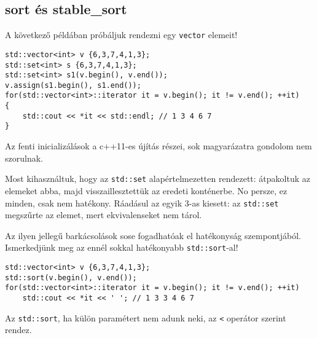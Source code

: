 \documentclass[a4paper,11.5pt,table]{article}
\begin{document}
	\subsection{sort és stable\_sort}
	A következő példában próbáljuk rendezni egy \texttt{vector} elemeit!
	\begin{lstlisting}
std::vector<int> v {6,3,7,4,1,3};
std::set<int> s {6,3,7,4,1,3};
std::set<int> s1(v.begin(), v.end());
v.assign(s1.begin(), s1.end());
for(std::vector<int>::iterator it = v.begin(); it != v.end(); ++it)
{
	std::cout << *it << std::endl; // 1 3 4 6 7 
}
	\end{lstlisting}
%	
	\begin{note}
		Az fenti inicializálások a c++11-es újítás részei, sok magyarázatra gondolom nem szorulnak.
%		
	\end{note}
	Most kihasználtuk, hogy az \texttt{std::set} alapértelmezetten rendezett: átpakoltuk az elemeket abba, majd visszaillesztettük az eredeti konténerbe. No persze, ez minden, csak nem hatékony. Ráadásul az egyik 3-as kiesett: az \texttt{std::set} megszűrte az elemet, mert ekvivalenseket nem tárol.
	
	\medskip
	Az ilyen jellegű barkácsolások sose fogadhatóak el hatékonyság szempontjából. Ismerkedjünk meg az ennél sokkal hatékonyabb \texttt{std::sort}-al!
	\begin{lstlisting}
std::vector<int> v {6,3,7,4,1,3};
std::sort(v.begin(), v.end());
for(std::vector<int>::iterator it = v.begin(); it != v.end(); ++it)
	std::cout << *it << ' '; // 1 3 3 4 6 7
	\end{lstlisting}
	Az \texttt{std::sort}, ha külön paramétert nem adunk neki, az \texttt{<} operátor szerint rendez.
	
\end{document}
